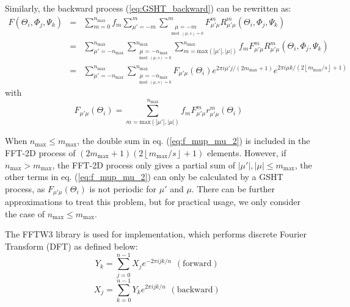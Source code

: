 Similarly, the backward process (\ref{eq:GSHT_backward}) can be rewritten
as:
\begin{eqnarray}
F(\Theta_{i},\Phi_{j},\Psi_{k}) & = & \sum_{m=0}^{n_{\mathrm{max}}}f_{m}\sum_{\mu'=-m}^{m}\sum_{\underset{\mod(\mu,s)=0}{\mu=-m}}^{m}F_{\mu'\mu}^{m}R_{\mu'\mu}^{m}(\Theta_{i},\Phi_{j},\Psi_{k})\label{eq:f_mup_mu_2}\\
 & = & \sum_{\mu'=-n_{\mathrm{max}}}^{n_{\mathrm{max}}}\sum_{\underset{\mod(\mu,s)=0}{\mu=-n_{\mathrm{max}}}}^{n_{\mathrm{max}}}\sum_{m=\mathrm{max}\left(\left|\mu'\right|,\left|\mu\right|\right)}^{n_{\mathrm{max}}}f_{m}F_{\mu'\mu}^{m}R_{\mu'\mu}^{m}(\Theta_{i},\Phi_{j},\Psi_{k})\nonumber \\
 & = & \sum_{\mu'=-n_{\mathrm{max}}}^{n_{\mathrm{max}}}\sum_{\underset{\mod(\mu,s)=0}{\mu=-n_{\mathrm{max}}}}^{n_{\mathrm{max}}}F_{\mu'\mu}(\Theta_{i})e^{2\pi i\mu'j/(2m_{\mathrm{max}}+1)}e^{2\pi i\mu k/(2\left\lfloor m_{\mathrm{max}}/s\right\rfloor +1)}\nonumber 
\end{eqnarray}
with
\begin{equation}
F_{\mu'\mu}(\Theta_{i})=\sum_{m=\mathrm{max}\left(\left|\mu'\right|,\left|\mu\right|\right)}^{n_{\mathrm{max}}}f_{m}F_{\mu'\mu}^{m}r_{\mu'\mu}^{m}(\Theta_{i})\label{eq:f_mup_mu_3}
\end{equation}

When
$n_{\max}\leq m_{\max}$, the double sum in eq. (\ref{eq:f_mup_mu_2})
is included in the \acs{FFT}-2D process of $\left(2m_{\mathrm{max}}+1\right)\left(2\left\lfloor m_{\mathrm{max}}/s\right\rfloor +1\right)$
elements. However, if $n_{\max}>m_{\max}$, the \acs{FFT}-2D process
only gives a partial sum of $\left|\mu'\right|,\left|\mu\right|\leq m_{\max}$,
the other terms in eq. (\ref{eq:f_mup_mu_2}) can only be calculated
by a \acs{GSHT} process, as $F_{\mu'\mu}(\Theta_{i})$ is not periodic
for $\mu'$ and $\mu$. There can be further approximations to treat
this problem, but for practical usage, we only consider the case of
$n_{\max}\leq m_{\max}$.

The FFTW3 library \citep{FFTW3} is used for implementation, which
performs discrete Fourier Transform (\acs{DFT}) as defined below:
\begin{equation}
Y_{k}=\sum_{j=0}^{n-1}X_{j}e^{-2\pi ijk/n}\begin{array}{c}
\mathrm{(forward)}\end{array}\label{eq:fftw3-fwd}
\end{equation}
\begin{equation}
X_{j}=\sum_{k=0}^{n-1}Y_{k}e^{2\pi ijk/n}\begin{array}{c}
\mathrm{(backward)}\end{array}\label{eq:fftw3-bwd}
\end{equation}

